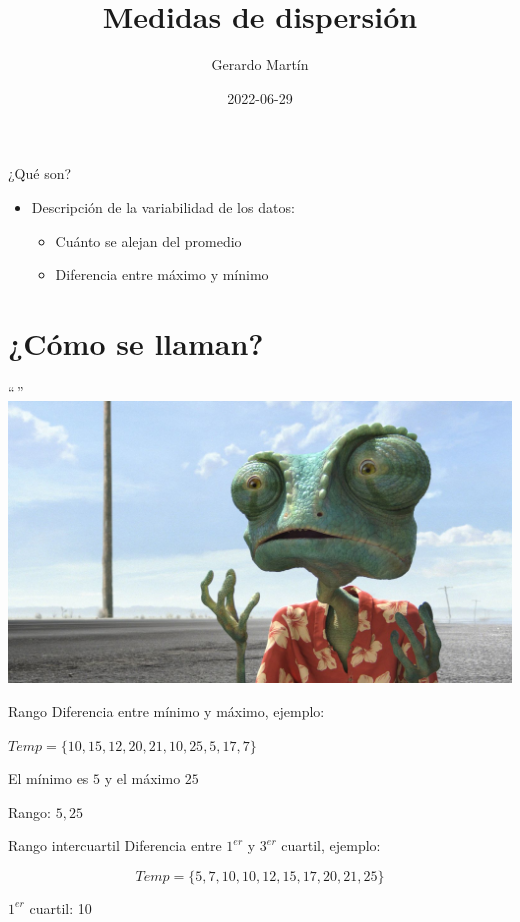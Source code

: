 \documentclass[
  11pt,
  ignorenonframetext,
]{beamer}
\title{Medidas de dispersión}
\author{Gerardo Martín}
\date{2022-06-29}
\providecommand{\tightlist}{%
  \setlength{\itemsep}{0pt}\setlength{\parskip}{0pt}}
\begin{document}
\frame{\titlepage}

\begin{frame}{¿Qué son?}
\protect\hypertarget{quuxe9-son}{}
\begin{itemize}
\item
  Descripción de la variabilidad de los datos:

  \begin{itemize}
  \tightlist
  \item
    Cuánto se alejan del promedio
  \item
    Diferencia entre máximo y mínimo
  \end{itemize}
\end{itemize}
\end{frame}

\hypertarget{cuxf3mo-se-llaman}{%
\section{¿Cómo se llaman?}\label{cuxf3mo-se-llaman}}

\begin{frame}{``\,''}
\protect\hypertarget{section}{}
\includegraphics{Figuras-dispersion/Rango.jpg}
\end{frame}

\begin{frame}{Rango}
\protect\hypertarget{rango}{}
Diferencia entre mínimo y máximo, ejemplo:

\(Temp = \{10, 15, 12, 20, 21, 10, 25, 5, 17, 7\}\)

El mínimo es \(5\) y el máximo \(25\)

Rango: \(5, 25\)
\end{frame}

\begin{frame}{Rango intercuartil}
\protect\hypertarget{rango-intercuartil}{}
Diferencia entre \(1^{er}\) y \(3^{er}\) cuartil, ejemplo:

\[Temp = \{5, 7, 10, 10, 12, 15, 17, 20, 21, 25\}\]

\(1^{er}\) cuartil: 10
\end{frame}
\end{document}
